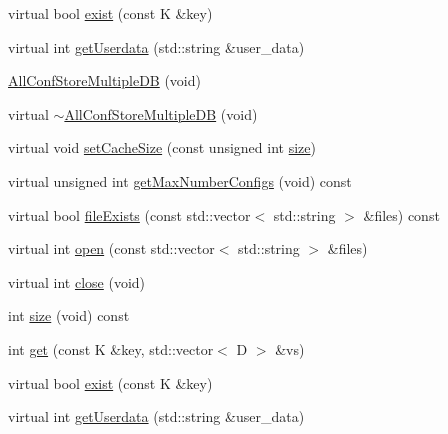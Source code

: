 \begin{DoxyCompactItemize}
\item 
virtual bool \mbox{\hyperlink{classFILEDB_1_1AllConfStoreMultipleDB_a5c9333af45c37c53c863ad2a07a9843b}{exist}} (const K \&key)
\item 
virtual int \mbox{\hyperlink{classFILEDB_1_1AllConfStoreMultipleDB_a9a314fba1056c35ffe54e35e98e83523}{get\+Userdata}} (std\+::string \&user\+\_\+data)
\item 
\mbox{\hyperlink{classFILEDB_1_1AllConfStoreMultipleDB_a0c45fce64168ca576e875747eb599927}{All\+Conf\+Store\+Multiple\+DB}} (void)
\item 
virtual \mbox{\hyperlink{classFILEDB_1_1AllConfStoreMultipleDB_a88489be8d488c6fe3a88312f200e7fdd}{$\sim$\+All\+Conf\+Store\+Multiple\+DB}} (void)
\item 
virtual void \mbox{\hyperlink{classFILEDB_1_1AllConfStoreMultipleDB_a746ef51b2dedf529a8e85528c0d31bfc}{set\+Cache\+Size}} (const unsigned int \mbox{\hyperlink{classFILEDB_1_1AllConfStoreMultipleDB_af05105b1ffe17093556a209ac9db1ed9}{size}})
\item 
virtual unsigned int \mbox{\hyperlink{classFILEDB_1_1AllConfStoreMultipleDB_a9348ec8716b4c716df67dca608bb1bde}{get\+Max\+Number\+Configs}} (void) const
\item 
virtual bool \mbox{\hyperlink{classFILEDB_1_1AllConfStoreMultipleDB_aa5a7c38b3785226da6f30a4ab5e51428}{file\+Exists}} (const std\+::vector$<$ std\+::string $>$ \&files) const
\item 
virtual int \mbox{\hyperlink{classFILEDB_1_1AllConfStoreMultipleDB_aa006283e8d6f0f079ca234c369f53679}{open}} (const std\+::vector$<$ std\+::string $>$ \&files)
\item 
virtual int \mbox{\hyperlink{classFILEDB_1_1AllConfStoreMultipleDB_a71aed1deeb31450afee4b692941dbae1}{close}} (void)
\item 
int \mbox{\hyperlink{classFILEDB_1_1AllConfStoreMultipleDB_af05105b1ffe17093556a209ac9db1ed9}{size}} (void) const
\item 
int \mbox{\hyperlink{classFILEDB_1_1AllConfStoreMultipleDB_a3a9858458bf0ecc76133e1c448568cf5}{get}} (const K \&key, std\+::vector$<$ D $>$ \&vs)
\item 
virtual bool \mbox{\hyperlink{classFILEDB_1_1AllConfStoreMultipleDB_a5c9333af45c37c53c863ad2a07a9843b}{exist}} (const K \&key)
\item 
virtual int \mbox{\hyperlink{classFILEDB_1_1AllConfStoreMultipleDB_a9a314fba1056c35ffe54e35e98e83523}{get\+Userdata}} (std\+::string \&user\+\_\+data)
\end{DoxyCompactItemize}
